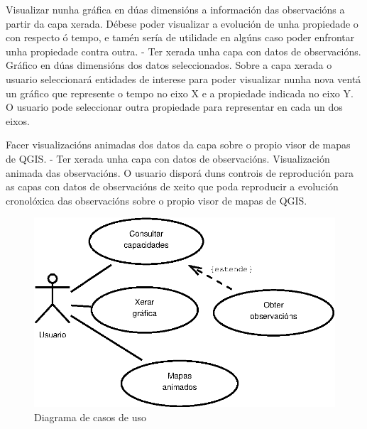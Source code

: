			{Visualizar nunha gráfica en dúas dimensións a información das observacións a partir da capa xerada. Débese poder visualizar a evolución de unha propiedade o con respecto ó tempo, e tamén sería de utilidade en algúns caso poder enfrontar unha propiedade contra outra. } %
			{-} %
			{Ter xerada unha capa con datos de observacións.} %
			{Gráfico en dúas dimensións dos datos seleccionados.} %
			{Sobre a capa xerada o usuario seleccionará entidades de interese para poder visualizar nunha nova ventá un gráfico que represente o tempo no eixo X e a propiedade indicada no eixo Y. O usuario pode seleccionar outra propiedade para representar en cada un dos eixos.
			} %
			
			{Facer visualizacións animadas dos datos da capa sobre o propio visor de mapas de QGIS.} %
			{-} %
			{Ter xerada unha capa con datos de observacións.} %
			{Visualización animada das observacións.} %
			{O usuario disporá duns controis de reprodución para as capas con datos de observacións de xeito que poda reproducir a evolución cronolóxica das observacións sobre o propio visor de mapas de QGIS. 
			} %

\begin{figure}[hbtp]
\centering
\includegraphics[scale=1]{images/uc.eps}
\caption{Diagrama de casos de uso}
\label{fig:uc} 
\end{figure}

